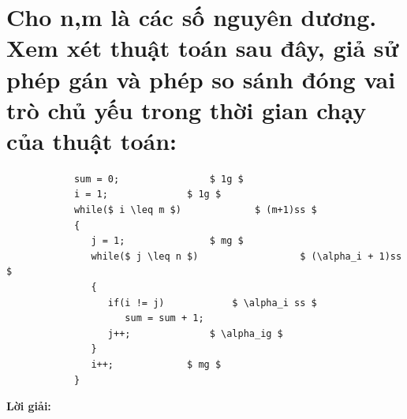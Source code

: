 \documentclass[12pt, letterpaper]{article}
\begin{document}
\section{Cho n,m là các số nguyên dương. Xem xét thuật toán sau đây, giả sử phép gán và phép so sánh đóng vai trò chủ yếu trong thời gian chạy của thuật toán:}

\begin{lstlisting}
            sum = 0;		        $ 1g $
            i = 1;		        $ 1g $
            while($ i \leq m $)		        $ (m+1)ss $
            {
               j = 1;		        $ mg $
               while($ j \leq n $)	                $ (\alpha_i + 1)ss $
               {
                  if(i != j)	        $ \alpha_i ss $
                     sum = sum + 1;
                  j++;		        $ \alpha_ig $
               }
               i++;		        $ mg $
            }
\end{lstlisting}
\textbf{Lời giải:}
\end{document}
